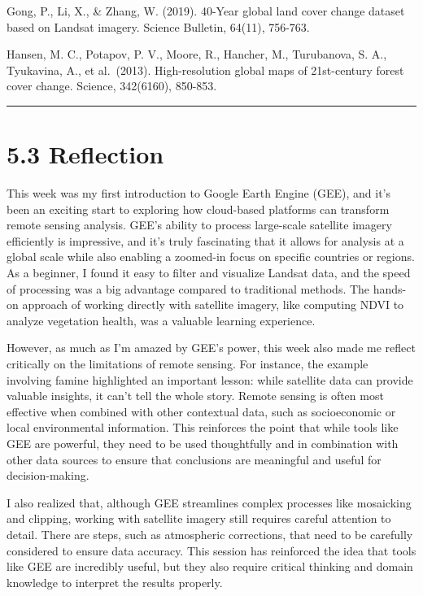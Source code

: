 \documentclass[
  letterpaper,
  DIV=11,
  numbers=noendperiod]{scrreprt}
\begin{document}
Gong, P., Li, X., \& Zhang, W. (2019). 40-Year global land cover change
dataset based on Landsat imagery. Science Bulletin, 64(11), 756-763.

Hansen, M. C., Potapov, P. V., Moore, R., Hancher, M., Turubanova, S.
A., Tyukavina, A., et al.~(2013). High-resolution global maps of
21st-century forest cover change. Science, 342(6160), 850-853.

\begin{center}\rule{0.5\linewidth}{0.5pt}\end{center}

\section{5.3 Reflection}\label{reflection-3}

This week was my first introduction to Google Earth Engine (GEE), and
it's been an exciting start to exploring how cloud-based platforms can
transform remote sensing analysis. GEE's ability to process large-scale
satellite imagery efficiently is impressive, and it's truly fascinating
that it allows for analysis at a global scale while also enabling a
zoomed-in focus on specific countries or regions. As a beginner, I found
it easy to filter and visualize Landsat data, and the speed of
processing was a big advantage compared to traditional methods. The
hands-on approach of working directly with satellite imagery, like
computing NDVI to analyze vegetation health, was a valuable learning
experience.

However, as much as I'm amazed by GEE's power, this week also made me
reflect critically on the limitations of remote sensing. For instance,
the example involving famine highlighted an important lesson: while
satellite data can provide valuable insights, it can't tell the whole
story. Remote sensing is often most effective when combined with other
contextual data, such as socioeconomic or local environmental
information. This reinforces the point that while tools like GEE are
powerful, they need to be used thoughtfully and in combination with
other data sources to ensure that conclusions are meaningful and useful
for decision-making.

I also realized that, although GEE streamlines complex processes like
mosaicking and clipping, working with satellite imagery still requires
careful attention to detail. There are steps, such as atmospheric
corrections, that need to be carefully considered to ensure data
accuracy. This session has reinforced the idea that tools like GEE are
incredibly useful, but they also require critical thinking and domain
knowledge to interpret the results properly.
\end{document}
